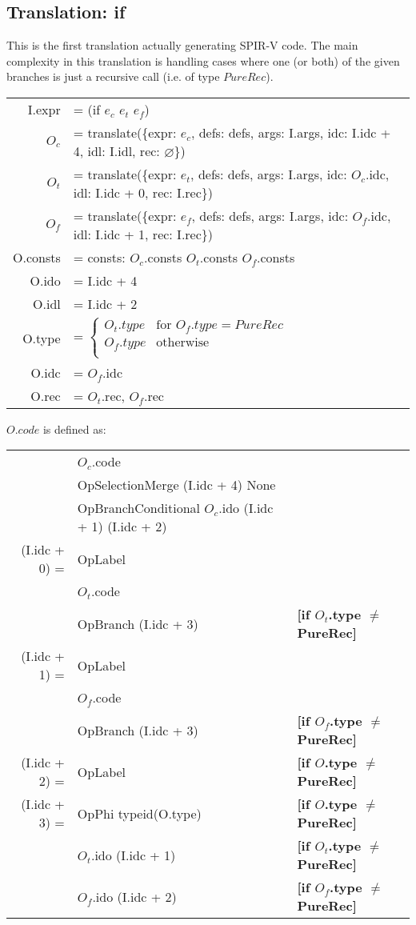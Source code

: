 \documentclass[letterpaper,12pt]{article}
\begin{document}
\subsection{Translation: if}

This is the first translation actually generating SPIR-V code. The main
complexity in this translation is handling cases where one (or both) of the
given branches is just a recursive call (i.e. of type $PureRec$).

\medskip
\begin{tabularx}{\linewidth}{rl}
	I.expr &= (if $e_c$ $e_t$ $e_f$) \\
	$O_c$ &= translate(\{expr: $e_c$, defs: defs, args: I.args, idc: I.idc + 4, idl: I.idl, rec: $\varnothing$\}) \\
	$O_t$ &= translate(\{expr: $e_t$, defs: defs, args: I.args, idc: $O_c$.idc, idl: I.idc + 0, rec: I.rec\}) \\
	$O_f$ &= translate(\{expr: $e_f$, defs: defs, args: I.args, idc: $O_f$.idc, idl: I.idc + 1, rec: I.rec\}) \\

	O.consts &= consts: $O_c$.consts $O_t$.consts $O_f$.consts \\
	O.ido &= I.idc + 4 \\
	O.idl &= I.idc + 2 \\
	O.type &= 
	$\begin{cases} 
		O_t.type & \text{for } O_f.type = PureRec \\
		O_f.type & \text{otherwise} \\
	\end{cases}$ \\
	O.idc &= $O_f$.idc \\
	O.rec &= $O_t$.rec, $O_f$.rec \\
\end{tabularx}

\medskip
$O.code$ is defined as: \\
\begin{tabularx}{\linewidth}{rll}
	& $O_c$.code \\
	& OpSelectionMerge (I.idc + 4) None \\
	& OpBranchConditional $O_c$.ido (I.idc + 1) (I.idc + 2) \\
	\cline{1-2}
	(I.idc + 0) = &OpLabel \\
	& $O_t$.code \\
	& OpBranch (I.idc + 3) & \textbf{[if $O_t$.type $\neq$ PureRec]} \\
	\cline{1-2}
	(I.idc + 1) = &OpLabel \\
	& $O_f$.code \\
	& OpBranch (I.idc + 3) & \textbf{[if $O_f$.type $\neq$ PureRec]} \\
	\cline{1-2}
	(I.idc + 2) = &OpLabel & \textbf{[if $O$.type $\neq$ PureRec]} \\
	(I.idc + 3) = &OpPhi typeid(O.type) & \textbf{[if $O$.type $\neq$ PureRec]} \\
		& \quad $O_t$.ido (I.idc + 1) & \quad \textbf{[if $O_t$.type $\neq$ PureRec]} \\
		& \quad $O_f$.ido (I.idc + 2) & \quad \textbf{[if $O_f$.type $\neq$ PureRec]} \\
\end{tabularx}
\end{document}
